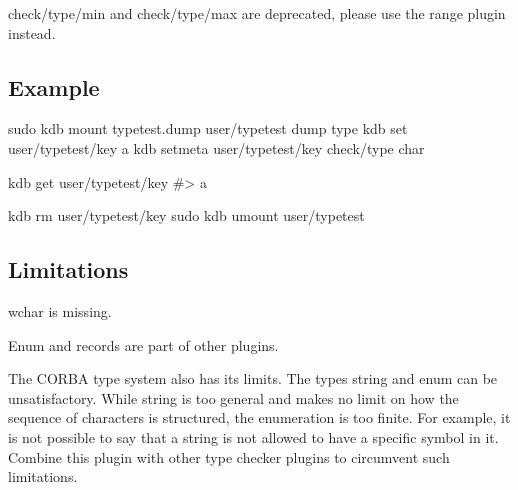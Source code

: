 {\ttfamily check/type/min} and {\ttfamily check/type/max} are deprecated, please use the range plugin instead.

\subsection*{Example}


\begin{DoxyCode}
sudo kdb mount typetest.dump user/typetest dump type
kdb set user/typetest/key a
kdb setmeta user/typetest/key check/type char

kdb get user/typetest/key
#> a

kdb rm user/typetest/key
sudo kdb umount user/typetest
\end{DoxyCode}


\subsection*{Limitations}

{\ttfamily wchar} is missing.

Enum and records are part of other plugins.

The {\ttfamily C\+O\+R\+BA} type system also has its limits. The types {\ttfamily string} and {\ttfamily enum} can be unsatisfactory. While string is too general and makes no limit on how the sequence of characters is structured, the enumeration is too finite. For example, it is not possible to say that a string is not allowed to have a specific symbol in it. Combine this plugin with other type checker plugins to circumvent such limitations. 